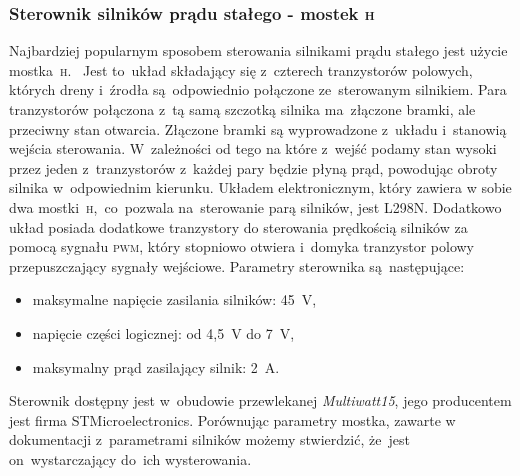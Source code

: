 \documentclass[11pt]{article}
\begin{document}
\subsubsection{Sterownik silników prądu stałego -  mostek \textsc{h}}
Najbardziej popularnym sposobem sterowania silnikami prądu stałego jest użycie mostka~\textsc{h}.
~Jest to~układ składający się z~czterech tranzystorów polowych, których dreny i~źrodła są~odpowiednio połączone ze~sterowanym silnikiem. Para tranzystorów połączona z~tą samą szczotką silnika ma~złączone bramki, ale przeciwny stan otwarcia.
Złączone bramki są wyprowadzone z~układu i~stanowią wejścia sterowania. W~zależności od tego na które z~wejść podamy stan wysoki przez jeden z~tranzystorów z~każdej pary będzie płyną prąd, powodując obroty silnika w~odpowiednim kierunku.
Układem elektronicznym, który zawiera w sobie dwa mostki~\textsc{h},~co~pozwala na~sterowanie parą silników, jest L298N.
Dodatkowo układ posiada dodatkowe tranzystory do sterowania prędkością silników za pomocą sygnału \textsc{pwm}, który stopniowo otwiera i~domyka tranzystor polowy przepuszczający sygnały wejściowe. Parametry sterownika są~następujące:
\begin{itemize}
	\item maksymalne napięcie zasilania silników: 45~\si{\volt},
	\item napięcie części logicznej: od 4,5~\si{\volt} do 7~\si{\volt},
	\item maksymalny prąd zasilający silnik: 2~\si{\ampere}.
\end{itemize}
Sterownik dostępny jest w~obudowie przewlekanej \textit{Multiwatt15}, jego producentem jest firma STMicroelectronics. Porównując parametry mostka, zawarte w dokumentacji \cite{h_bridge_datasheet} z~parametrami silników możemy stwierdzić, że~jest on~wystarczający do~ich wysterowania.
\end{document}
